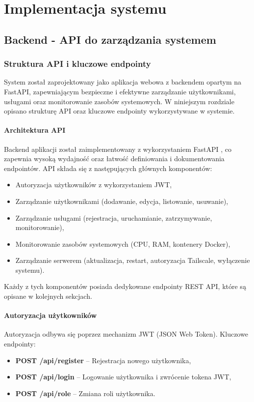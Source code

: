 \chapter{Implementacja systemu}

\section{Backend - API do zarządzania systemem}

\subsection{Struktura API i kluczowe endpointy}

System został zaprojektowany jako aplikacja webowa z backendem opartym na FastAPI\cite{FastAPI}, zapewniającym bezpieczne i efektywne zarządzanie użytkownikami, usługami oraz monitorowanie zasobów systemowych. W niniejszym rozdziale opisano strukturę API oraz kluczowe endpointy wykorzystywane w systemie.

\subsubsection{Architektura API}
Backend aplikacji został zaimplementowany z wykorzystaniem FastAPI \cite{FastAPI}, co zapewnia wysoką wydajność oraz łatwość definiowania i dokumentowania endpointów. API składa się z następujących głównych komponentów:
\begin{itemize}
    \item Autoryzacja użytkowników z wykorzystaniem JWT,
    \item Zarządzanie użytkownikami (dodawanie, edycja, listowanie, usuwanie),
    \item Zarządzanie usługami (rejestracja, uruchamianie, zatrzymywanie, monitorowanie),
    \item Monitorowanie zasobów systemowych (CPU, RAM, kontenery Docker),
    \item Zarządzanie serwerem (aktualizacja, restart, autoryzacja Tailscale, wyłączenie systemu).
\end{itemize}

Każdy z tych komponentów posiada dedykowane endpointy REST API, które są opisane w kolejnych sekcjach.

\subsubsection{Autoryzacja użytkowników}
Autoryzacja odbywa się poprzez mechanizm JWT (JSON Web Token). Kluczowe endpointy:
\begin{itemize}
    \item \textbf{POST /api/register} – Rejestracja nowego użytkownika,
    \item \textbf{POST /api/login} – Logowanie użytkownika i zwrócenie tokena JWT,
    \item \textbf{POST /api/role} – Zmiana roli użytkownika.
\end{itemize}

